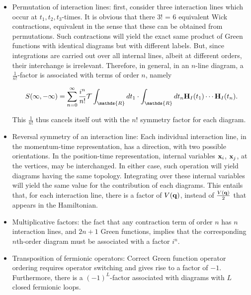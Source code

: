 \documentclass{homework}
\begin{document}
\begin{itemize}
    \item Permutation of interaction lines: first, consider three interaction lines which occur at $t_1, t_2, t_3$-times. It is obvious that there 3! = 6 equivalent Wick contractions, equivalent in the sense that these can be obtained from permutations. Such contractions will yield the exact same product of Green functions with identical diagrams but with different labels. But, since integrations are carried out over all internal lines, albeit at different orders, their interchange is irrelevant. Therefore, in general, in an $n$-line diagram, a $\frac{1}{n!}$-factor is associated with terms of order $n$, namely 

    $$
        S(\infty, -\infty) = \sum_{n=0}^{\infty} \frac{i^n}{n!} \mathcal{T} \int_{\mathds{R}} 
        dt_1 \cdot \int_{\mathds{R}} dt_n {\bf H}_I(t_1) \cdots {\bf H}_I(t_n).
    $$

    This $\frac{1}{n!}$ thus cancels itself out with the $n!$ symmetry factor for each diagram. \\

    \item Reversal symmetry of an interaction line: Each individual interaction line, in the momentum-time representation, has a direction, with two possible orientations. In the position-time representation, internal variables ${\bf x}_i$, ${\bf x}_j$, at the vertices, may be interchanged. In either case, such operation will yield diagrams having the same topology. Integrating over these internal variables will yield the same value for the contribution of each diagrams. This entails that, for each interaction line, there is a factor of $V({\bf q})$, instead of $\frac{V({\bf q})}{2}$ that appears in the Hamiltonian. \\

    \item Multiplicative factors: the fact that any contraction term of order $n$ has $n$ interaction lines, and $2n+1$ Green functions, implies that the corresponding $n$th-order diagram must be associated with a factor $i^n$. \\

    \item Transposition of fermionic operators: Correct Green function operator ordering requires operator switching and gives rise to a factor of $-1$. 
    Furthermore, there is a $(-1)^L$-factor associated with diagrams with $L$ closed fermionic loops. 
    
\end{itemize}
\end{document}
